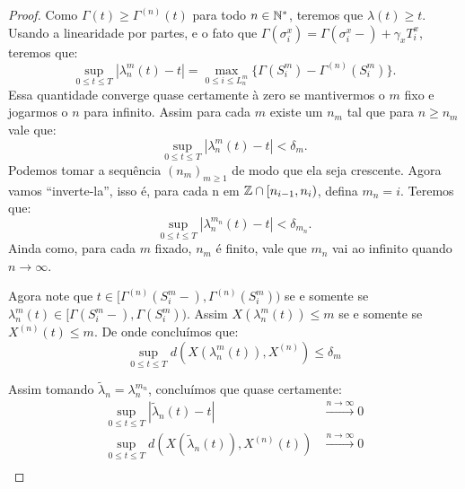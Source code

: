 \begin{proof}
  Como $\Gamma(t) \geq \Gamma^{(n)}(t)$ para todo $n \in {\mathbb{N^*}}$, teremos
  que $\lambda(t) \geq t$. Usando a linearidade por partes, e o fato
  que $\Gamma(\sigma^x_i) = \Gamma(\sigma_i^x-) + \gamma_x T^x_i$,
  teremos que:
  \begin{displaymath}
    \sup_{0 \leq t \leq T} |\lambda_n^m(t) - t| =
    \max_{0 \leq i \leq L_n^m} \{ \Gamma(S_i^m) -
    \Gamma^{(n)}(S_i^m)\}.
  \end{displaymath}
  Essa quantidade converge quase certamente à zero se mantivermos o
  $m$ fixo e jogarmos o $n$ para infinito. Assim para cada $m$ existe
  um $n_m$ tal que para $n \geq n_m$ vale que:
  \begin{displaymath}
    \sup_{0 \leq t \leq T} |\lambda_n^m(t) - t| < \delta_m.
  \end{displaymath}
  Podemos tomar a sequência $(n_m)_{m \geq 1}$ de modo que ela seja
  crescente. Agora vamos ``inverte-la'', isso é, para cada n em ${\mathbb{Z}}
  \cap [n_{i-1}, n_i)$, defina $m_n = i$. Teremos que:
  \begin{displaymath}
    \sup_{0 \leq t \leq T} |\lambda_n^{m_n}(t) - t| < \delta_{m_n}.
  \end{displaymath}
  Ainda como, para cada $m$ fixado, $n_m$ é finito, vale que $m_n$ vai
  ao infinito quando $n \to \infty$.
  
  Agora note que $t \in [\Gamma^{(n)}(S_{i}^m-),
  \Gamma^{(n)}(S_{i}^m))$ se e somente se $\lambda_n^m(t) \in
  [\Gamma(S_{i}^m-), \Gamma(S_{i}^m))$. Assim $X(\lambda_n^m(t)) \leq
  m$ se e somente se $X^{(n)}(t) \leq m$. De onde concluímos que:
  \begin{displaymath}
    \sup_{0 \leq t \leq T} d\left(X(\lambda_n^m(t)), X^{(n)}\right)
    \leq \delta_m
  \end{displaymath}

  Assim tomando $\tilde{\lambda}_n = \lambda_n^{m_n}$, concluímos que
  quase certamente:
  \begin{align*}
    \sup_{0 \leq t \leq T} |\tilde{\lambda}_n(t) - t|
    &\xrightarrow{n\to\infty} 0 \\
    \sup_{0 \leq t \leq T} d(X(\tilde{\lambda}_n(t)), X^{(n)}(t))
    &\xrightarrow{n\to\infty} 0 \\
  \end{align*}
\end{proof}

